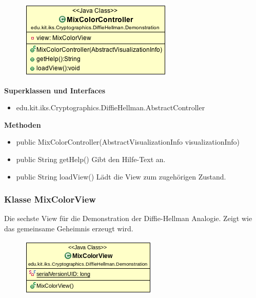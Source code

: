 \documentclass{article}
\begin{document}
      \begin{figure}[H]
        \centering
        \includegraphics{resources/edu-kit-iks-Cryptographics-DiffieHellman-Demonstration-MixColorController}
      \end{figure}

      \textbf{Superklassen und Interfaces}
      \begin{itemize}
        \item edu.kit.iks.Cryptographics.DiffieHellman.AbstractController
      \end{itemize}

      \textbf{Methoden}
      \begin{itemize}
          \item public MixColorController(AbstractVisualizationInfo visualizationInfo)
        \item public String getHelp() \newline
        Gibt den Hilfe-Text an.
        \item public String loadView() \newline
        Lädt die View zum zugehörigen Zustand.
      \end{itemize}

\subsubsection{Klasse MixColorView}
      Die sechste View für die Demonstration der Diffie-Hellman Analogie.
      Zeigt wie das gemeinsame Geheimnis erzeugt wird.

      \begin{figure}[H]
        \centering
        \includegraphics{resources/edu-kit-iks-Cryptographics-DiffieHellman-Demonstration-MixColorView}
      \end{figure}
\end{document}
